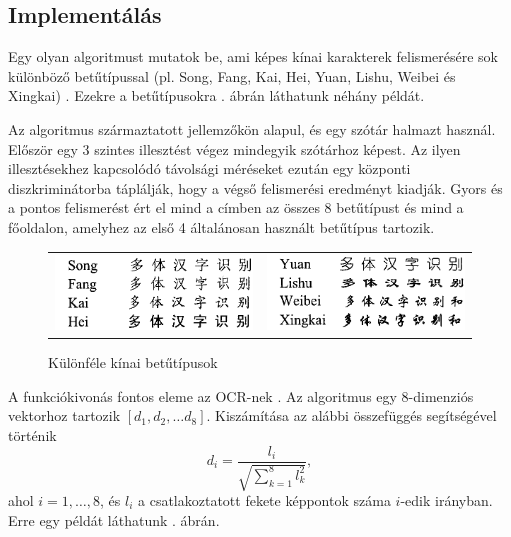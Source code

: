 \subsection{Implementálás}

Egy olyan algoritmust mutatok be, ami képes kínai karakterek felismerésére sok különböző betűtípussal (pl. Song, Fang, Kai, Hei, Yuan, Lishu, Weibei és Xingkai) \cite{wu2002recognition}. Ezekre a betűtípusokra . ábrán láthatunk néhány példát.

Az algoritmus származtatott jellemzőkön alapul, és egy szótár halmazt használ. Először egy 3 szintes illesztést végez mindegyik szótárhoz képest. Az ilyen illesztésekhez kapcsolódó távolsági méréseket ezután egy központi diszkriminátorba táplálják, hogy a végső felismerési eredményt kiadják. Gyors és a pontos felismerést ért el mind a címben az összes 8 betűtípust és mind a főoldalon, amelyhez az első 4 általánosan használt betűtípus tartozik.

\begin{figure}[h]
\centering
\begin{tabular}{ c c }
\includegraphics[scale=0.35]{images/chinese_fonts1} & \includegraphics[scale=0.35]{images/chinese_fonts2}
\end{tabular}
\caption{Különféle kínai betűtípusok}
\label{fig:chinese_fonts}
\end{figure}

A funkciókivonás fontos eleme az OCR-nek \cite{wu2002recognition}. Az algoritmus egy 8-dimenziós vektorhoz tartozik $[d_1, d_2, \ldots d_8]$. Kiszámítása az alábbi összefüggés segítségével történik
$$
d_i = \dfrac{l_i}{\sqrt{\displaystyle \sum_{k=1}^8 l_k^2}},
$$
ahol $i = 1, \ldots, 8$, és $l_i$ a csatlakoztatott fekete képpontok száma $i$-edik irányban. Erre egy példát láthatunk . ábrán.

